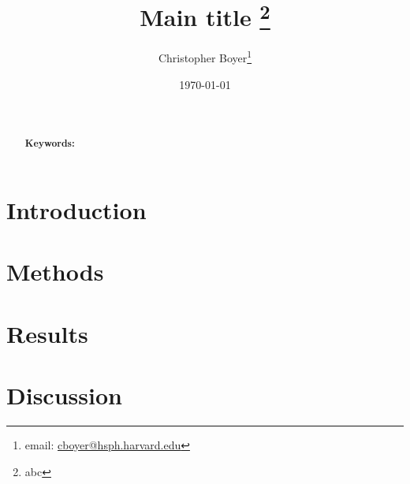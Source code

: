 \documentclass[11pt]{article}
\begin{document}
\begin{titlepage}
\title{Main title \thanks{abc}}
\author[1]{Christopher Boyer\thanks{email: \href{mailto:cboyer@hsph.harvard.edu}{cboyer@hsph.harvard.edu}}}
\date{\today}
\maketitle

\begin{abstract}
\noindent \\
\vspace{0in} \\
\noindent\textbf{Keywords:} 
\bigskip
\end{abstract}
\setcounter{page}{0}
\thispagestyle{empty}
\end{titlepage}
\pagebreak \newpage

\doublespacing

\section{Introduction} \label{sec:introduction}

\section{Methods} \label{sec:methods}

\section{Results} \label{sec:results}

\section{Discussion} \label{sec:discussion}


\begin{appendix}
    \renewcommand{\thefigure}{A\arabic{figure}}
    \setcounter{figure}{0}
    
    \renewcommand{\thetable}{A\arabic{table}}
    \setcounter{table}{0}
    
    \renewcommand{\theequation}{A\arabic{equation}}
    \setcounter{equation}{0}

    \renewcommand{\thesection}{\Alph{section}}

    \newpage

    
\end{appendix}

\onehalfspacing
\end{document}
